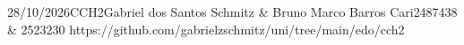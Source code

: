 \documentclass{article}
\begin{document}
{28/10/2026}{CCH}{2}{Gabriel dos Santos Schmitz \& Bruno Marco Barros Cari}{2487438 \& 2523230}
{https://github.com/gabrielzschmitz/uni/tree/main/edo/cch2}




\newpage
\printbibliography\
\end{document}
